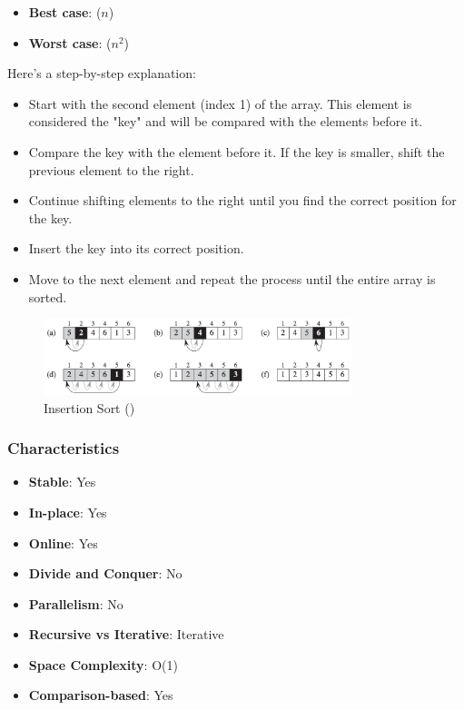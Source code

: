 \begin{itemize}
    \item \textbf{Best case}: \theta($n$)
    \item \textbf{Worst case}: \theta($n^2$)
\end{itemize}

Here's a step-by-step explanation:

\begin{itemize}
    \item Start with the second element (index 1) of the array. This element is considered the "key" and will be compared with the elements before it.
    \item Compare the key with the element before it. If the key is smaller, shift the previous element to the right.
    \item Continue shifting elements to the right until you find the correct position for the key.
    \item Insert the key into its correct position.
    \item Move to the next element and repeat the process until the entire array is sorted.
\end{itemize}

\begin{figure}[H]
    \centering
    \includegraphics[width=0.8\textwidth]{assets/insertion_sort.png}
    \caption{Insertion Sort (\cite{cormen2022introduction})}
\end{figure}

\subsubsection*{Characteristics}

\begin{itemize}
    \item \textbf{Stable}: Yes
    \item \textbf{In-place}: Yes
    \item \textbf{Online}: Yes
    \item \textbf{Divide and Conquer}: No
    \item \textbf{Parallelism}: No
    \item \textbf{Recursive vs Iterative}: Iterative
    \item \textbf{Space Complexity}: O(1)
    \item \textbf{Comparison-based}: Yes
\end{itemize}

